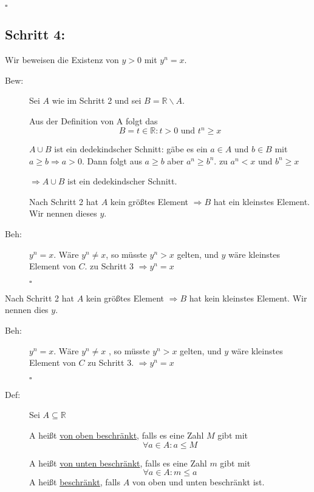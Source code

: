 \documentclass[12pt,a4paper,leqno]{article}
\begin{document}
  \begin{flushright} $\square$ \end{flushright}
  
  \subsection*{Schritt 4:}
  
  Wir beweisen die Existenz von $y > 0$ mit $y^n = x$.
  
  \begin{description}
    
    \item[Bew:] Sei $A$ wie im Schritt 2 und sei $B = \mathbb{R} \backslash A$.
      
      Aus der Definition von A folgt das 
      $$ B = { t \in \mathbb{R} : t > 0 \textrm{ und } t^n \geq x } $$
      
      $A \cup B$ ist ein dedekindscher Schnitt: gäbe es ein $a \in A$ und $b \in B$ mit $a \geq b \Rightarrow a > 0$. Dann folgt aus $a \geq b$ aber $a^n \geq b^n$. \blitze{} zu $a^n < x$ und $b^n \geq x$ 
      
      $ \Rightarrow A \cup B$  ist ein dedekindscher Schnitt.
      
      Nach Schritt 2 hat $A$ kein größtes Element $\Rightarrow B$ hat ein kleinstes Element. Wir nennen dieses $y$.
      
    \item[Beh:] $y^n = x$. Wäre $y^n \neq x$, so müsste $y^n > x$ gelten, und $y$ wäre kleinstes Element von $C$. \blitze zu Schritt 3 $\Rightarrow y^n = x$
      \begin{flushright} $ \square $ \end{flushright}
  \end{description}
  
  
  Nach Schritt 2 hat $A$ kein größtes Element $\Rightarrow B$ hat  kein kleinstes Element. Wir nennen dies $y$.
  
  \begin{description}
    \item[Beh:] $y^{n}=x$. Wäre $y^{n}\neq x$ , so müsste $y^n>x$ gelten, und $y$ wäre kleinstes Element von $C$ \blitze zu Schritt 3. $\Rightarrow y^n=x$
      \begin{flushright}$ \square $ \end{flushright} 
  \end{description}
  \begin{description}
    \item[Def:] Sei $A\subseteq \mathbb{R}$
      
      A heißt \underline{von oben beschränkt}, falls es eine Zahl $M$ gibt mit $$\forall a \in A:a\leq M$$ 
      
      A heißt \underline{von unten beschränkt}, falls es eine Zahl $m$ gibt mit $$\forall a \in A:m\leq a$$
      A heißt \underline{beschränkt}, falls $A$ von oben und unten beschränkt ist.
  \end{description}
  
\end{document}
